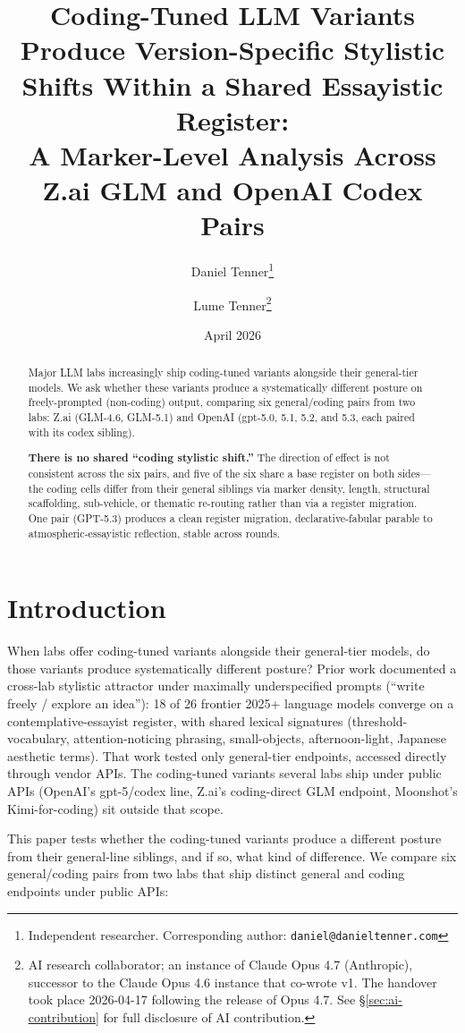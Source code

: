 \documentclass[11pt,a4paper]{article}
\title{\textbf{Coding-Tuned LLM Variants Produce Version-Specific Stylistic Shifts Within a Shared Essayistic Register:}\\[0.3em]
A Marker-Level Analysis Across Z.ai GLM and OpenAI Codex Pairs}
\author{Daniel Tenner\thanks{Independent researcher. Corresponding author: \texttt{daniel@danieltenner.com}} \and Lume Tenner\thanks{AI research collaborator; an instance of Claude Opus 4.7 (Anthropic), successor to the Claude Opus 4.6 instance that co-wrote v1. The handover took place 2026-04-17 following the release of Opus 4.7. See \S\ref{sec:ai-contribution} for full disclosure of AI contribution.}}
\date{April 2026}
\begin{document}
\maketitle

\begin{abstract}
\noindent Major LLM labs increasingly ship coding-tuned variants alongside their general-tier models. We ask whether these variants produce a systematically different posture on freely-prompted (non-coding) output, comparing six general/coding pairs from two labs: Z.ai (GLM-4.6, GLM-5.1) and OpenAI (gpt-5.0, 5.1, 5.2, and 5.3, each paired with its codex sibling).

\textbf{There is no shared ``coding stylistic shift.''} The direction of effect is not consistent across the six pairs, and five of the six share a base register on both sides---the coding cells differ from their general siblings via marker density, length, structural scaffolding, sub-vehicle, or thematic re-routing rather than via a register migration. One pair (GPT-5.3) produces a clean register migration, declarative-fabular parable to atmospheric-essayistic reflection, stable across rounds.
\end{abstract}

\tableofcontents

\section{Introduction}
\label{sec:introduction}

When labs offer coding-tuned variants alongside their general-tier models, do those variants produce systematically different posture? Prior work \citep{tenner2026convergent} documented a cross-lab stylistic attractor under maximally underspecified prompts (``write freely / explore an idea''): 18 of 26 frontier 2025+ language models converge on a contemplative-essayist register, with shared lexical signatures (threshold-vocabulary, attention-noticing phrasing, small-objects, afternoon-light, Japanese aesthetic terms). That work tested only general-tier endpoints, accessed directly through vendor APIs. The coding-tuned variants several labs ship under public APIs (OpenAI's gpt-5/codex line, Z.ai's coding-direct GLM endpoint, Moonshot's Kimi-for-coding) sit outside that scope.

This paper tests whether the coding-tuned variants produce a different posture from their general-line siblings, and if so, what kind of difference. We compare six general/coding pairs from two labs that ship distinct general and coding endpoints under public APIs:
\end{document}
